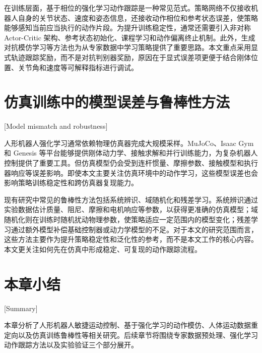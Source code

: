 在训练层面，基于相位的强化学习动作跟踪是一种常见范式。策略网络不仅接收机器人自身的关节状态、速度和姿态信息，还接收动作相位和参考状态误差，使策略能够感知当前应当执行的动作片段。为提升训练稳定性，通常还需要引入非对称 Actor-Critic 架构、参考状态初始化、课程学习和动作偏离终止机制\cite{deepmimic2018}。此外，生成对抗模仿学习等方法也为从专家数据中学习策略提供了重要思路\cite{gail2016}。本文重点采用显式轨迹跟踪奖励，而不是对抗判别器奖励，原因在于显式误差项更便于结合刚体位置、关节角和速度等可解释指标进行调试。

\section{仿真训练中的模型误差与鲁棒性方法}[Model mismatch and robustness]

人形机器人强化学习通常依赖物理仿真器完成大规模采样。MuJoCo、Isaac Gym 和 Genesis 等平台能够提供刚体动力学、接触求解和并行训练能力，为复杂机器人控制提供了重要工具\cite{todorov2012mujoco,isaacgym2021,Genesis}。但仿真模型仍会受到连杆惯量、摩擦参数、接触模型和执行器响应等误差影响。即使本文主要关注仿真环境中的动作学习，这些模型误差也会影响策略训练稳定性和跨仿真器复现能力。

现有研究中常见的鲁棒性方法包括系统辨识、域随机化和残差学习。系统辨识通过实验数据估计质量、阻尼、摩擦和电机响应等参数，以获得更准确的仿真模型\cite{hwangbo2019learning,yu2019sim,du2021auto}；域随机化则在训练时随机扰动物理参数，使策略适应一定范围内的模型变化\cite{tobin2017domain,tan2018sim,peng2018sim}；残差学习通过额外模型补偿基础控制器或动力学模型的不足\cite{silver2018residual,johannink2019residual,alakuijala2021residual}。对于本文的研究范围而言，这些方法主要作为提升策略稳定性和泛化性的参考，而不是本文工作的核心内容。本文更关注如何先在仿真中形成稳定、可复现的动作跟踪流程。

\section{本章小结}[Summary]

本章分析了人形机器人敏捷运动控制、基于强化学习的动作模仿、人体运动数据重定向以及仿真训练鲁棒性等相关研究。后续章节将围绕专家数据预处理、强化学习动作跟踪方法以及实验验证三个部分展开。

